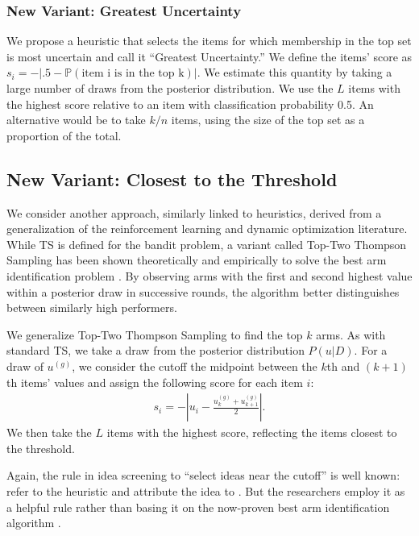\documentclass[nonblindrev]{informs3}
\newcommand{\numitems}{n}
\newcommand{\numtopset}{k}
\newcommand{\numperset}{L}
\begin{document}
\subsubsection{New Variant: Greatest Uncertainty}

We propose a heuristic that selects the items for which membership in the top set is most uncertain and call it ``Greatest Uncertainty.''  We define the items' score as $s_i=-|.5-\mathbb{P} (\text{item i is in the top k})|$. We estimate this quantity by taking a large number of draws from the posterior distribution. We use the $\numperset$ items with the highest score relative to an item with classification probability 0.5. An alternative would be to take $\numtopset/\numitems$ items, using the size of the top set as a proportion of the total. 

\subsection{New Variant: Closest to the Threshold}

We consider another approach, similarly linked to heuristics, derived from a generalization of the reinforcement learning and dynamic optimization literature. While TS is defined for the bandit problem, a variant called Top-Two Thompson Sampling has been shown theoretically and empirically to solve the best arm identification problem \citep{russo2016simple}. By observing arms with the first and second highest value within a posterior draw in successive rounds, the algorithm better distinguishes between similarly high performers.

We generalize Top-Two Thompson Sampling to find the top $k$ arms. As with standard TS, we take a draw from the posterior distribution $P(u|D)$. For a draw of $u^{(g)}$, we consider the cutoff the midpoint between the $k$th and $(k+1)$th items' values and assign the following score for each item $i$:
\begin{align}
s_i= - | u_i - \frac{u_k^{(g)} +u_{k+1}^{(g)} }{2}|.
\end{align} 
We then take the $\numperset$ items with the highest score, reflecting the items closest to the threshold. 

Again, the rule in idea screening to ``select ideas near the cutoff'' is well known: \cite{toubia2007adaptive} refer to the heuristic and attribute the idea to \cite{bradlow1998some}. But the researchers employ it as a helpful rule rather than basing it on the now-proven best arm identification algorithm \citep{russo2016simple}.
\end{document}
